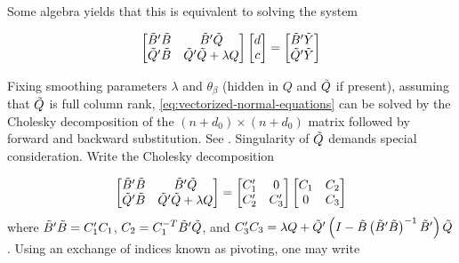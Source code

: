 \noindent
Some algebra yields that this is equivalent to solving the system

\begin{equation} \label{eq:vectorized-normal-equations}
\begin{bmatrix}
\tilde{B}'\tilde{B} & \tilde{B}'\tilde{Q} \\
\tilde{Q}'\tilde{B} & \tilde{Q}'\tilde{Q} + \lambda Q\\
\end{bmatrix}
\begin{bmatrix}
d\\
c\\
\end{bmatrix}
= \begin{bmatrix}
\tilde{B}'\tilde{Y} \\
 \tilde{Q}'\tilde{Y}\\
\end{bmatrix}
\end{equation}


Fixing smoothing parameters $\lambda$ and $\theta_\beta$ (hidden in $Q$ and $\tilde{Q}$ if present), assuming that $\tilde{Q}$ is full column rank, \ref{eq:vectorized-normal-equations} can be solved by the Cholesky decomposition of the $\left( n + d_0 \right) \times \left( n + d_0 \right)$ matrix followed by forward and backward substitution. See \citet{golub2012matrix}. Singularity of $\tilde{Q}$ demands special consideration. Write the Cholesky decomposition

\begin{equation} \label{eq:normal-equation-cholesky}
\begin{bmatrix}
\tilde{B}'\tilde{B} & \tilde{B}'\tilde{Q} \\
\tilde{Q}'\tilde{B} & \tilde{Q}'\tilde{Q} + \lambda Q\\
\end{bmatrix}
= \begin{bmatrix}
C'_1 & 0 \\
C'_2  & C'_3 
\end{bmatrix}
\begin{bmatrix}
C_1 & C_2 \\
0  & C_3 
\end{bmatrix}
\end{equation}
\noindent
where $\tilde{B}'\tilde{B} = C'_1 C_1$, $C_2 = C_1^{-T} \tilde{B}' \tilde{Q}$, and $C'_3 C_3 = \lambda Q +  \tilde{Q}'\left( I - \tilde{B}\left( \tilde{B}' \tilde{B} \right)^{-1} \tilde{B}' \right)\tilde{Q}$. Using an exchange of indices known as pivoting, one may write 

